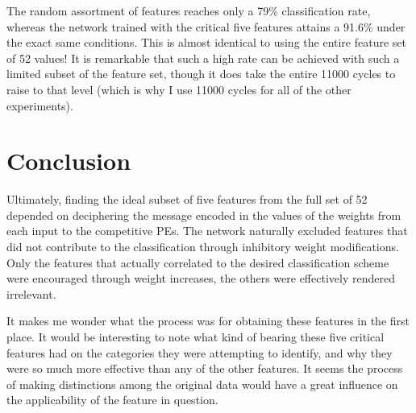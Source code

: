 \documentclass[12pt]{article}
\begin{document}
The random assortment of features reaches only a 79\% classification rate, whereas the network trained with the critical five features attains a 91.6\% under the exact same conditions.  This is almost identical to using the entire feature set of 52 values!  It is remarkable that such a high rate can be achieved with such a limited subset of the feature set, though it does take the entire 11000 cycles to raise to that level (which is why I use 11000 cycles for all of the other experiments).  

\section{Conclusion}

Ultimately, finding the ideal subset of five features from the full set of 52 depended on deciphering the message encoded in the values of the weights from each input to the competitive PEs.  The network naturally excluded features that did not contribute to the classification through inhibitory weight modifications.  Only the features that actually correlated to the desired classification scheme were encouraged through weight increases, the others were effectively rendered irrelevant.  

It makes me wonder what the process was for obtaining these features in the first place.  It would be interesting to note what kind of bearing these five critical features had on the categories they were attempting to identify, and why they were so much more effective than any of the other features.  It seems the process of making distinctions among the original data would have a great influence on the applicability of the feature in question.  
\end{document}

